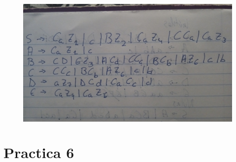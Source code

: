 \documentclass{article}
\begin{document}
  \begin{figure}[H]
    \centering
    \includegraphics[scale=0.1]{fotos/chomsky2.jpg}
  \end{figure}

\section{Practica 6}
\end{document}
